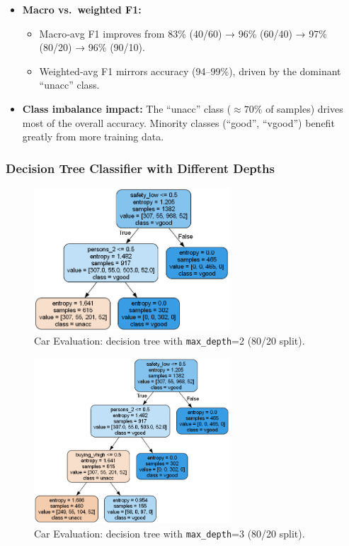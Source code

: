 \begin{itemize}
\begin{itemize}
	      \end{itemize}
	\item \textbf{Macro vs.\ weighted F1:}
	      \begin{itemize}
		      \item Macro‑avg F1 improves from 83\% (40/60) → 96\% (60/40) → 97\% (80/20) → 96\% (90/10).
		      \item Weighted‑avg F1 mirrors accuracy (94–99\%), driven by the dominant “unacc” class.
	      \end{itemize}
	\item \textbf{Class imbalance impact:} The “unacc” class (\(\approx70\%\) of samples) drives most of the overall accuracy. Minority classes (“good”, “vgood”) benefit greatly from more training data.
\end{itemize}

\clearpage
\subsubsection*{Decision Tree Classifier with Different Depths}
\begin{figure}[H]
	\centering
	\includegraphics[width=0.65\textwidth]{imgs/dt-mini/dt__car_evaluation__80_vs_20__2.png}
	\caption{Car Evaluation: decision tree with \texttt{max\_depth}=2 (80/20 split).}\label{fig:ce-dt-depth-2}
\end{figure}

\begin{figure}[H]
	\centering
	\includegraphics[width=0.65\textwidth]{imgs/dt-mini/dt__car_evaluation__80_vs_20__3.png}
	\caption{Car Evaluation: decision tree with \texttt{max\_depth}=3 (80/20 split).}\label{fig:ce-dt-depth-3}
\end{figure}

